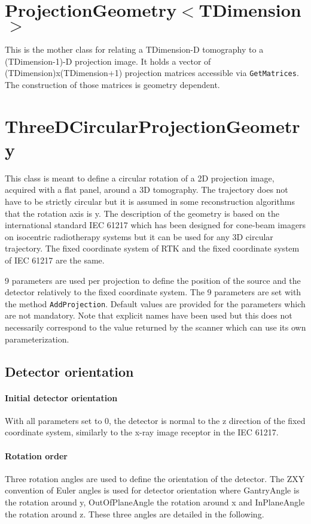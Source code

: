 \documentclass{article}
\begin{document}
\section{ProjectionGeometry$<$TDimension$>$}

This is the mother class for relating a TDimension-D tomography to a (TDimension-1)-D projection image. It holds a vector of (TDimension)x(TDimension+1) projection matrices accessible via \verb+GetMatrices+. The construction of those matrices is geometry dependent.

\section{ThreeDCircularProjectionGeometry}

This class is meant to define a circular rotation of a 2D projection image, acquired with a flat panel, around a 3D tomography. The trajectory does not have to be strictly circular but it is assumed in some reconstruction algorithms that the rotation axis is y. The description of the geometry is based on the international standard IEC 61217 which has been designed for cone-beam imagers on isocentric radiotherapy systems but it can be used for any 3D circular trajectory. The fixed coordinate system of RTK and the fixed coordinate system of IEC 61217 are the same.

9 parameters are used per projection to define the position of the source and the detector relatively to the fixed coordinate system. The 9 parameters are set with the method \verb+AddProjection+. Default values are provided for the parameters which are not mandatory. Note that explicit names have been used but this does not necessarily correspond to the value returned by the scanner which can use its own parameterization.

\subsection{Detector orientation}

\paragraph{Initial detector orientation}

With all parameters set to 0, the detector is normal to the z direction of the fixed coordinate system, similarly to the x-ray image receptor in the IEC 61217.

\paragraph{Rotation order} Three rotation angles are used to define the orientation of the detector. The ZXY convention of Euler angles is used for detector orientation where GantryAngle is the rotation around y, OutOfPlaneAngle the rotation around x and InPlaneAngle the rotation around z. These three angles are detailed in the following.
\end{document}
